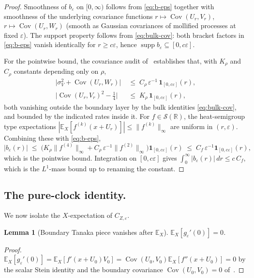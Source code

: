 \documentclass[11pt,reqno]{amsart}
\theoremstyle{plain}
\newtheorem{lemma}[theorem]{Lemma}
\theoremstyle{definition}
\theoremstyle{remark}
\newcommand{\R}{\mathbb{R}}
\newcommand{\E}{\mathbb{E}}
\newcommand{\IBM}{Z}
\DeclareMathOperator{\Cov}{Cov}
\DeclareMathOperator{\supp}{supp}
\begin{document}
\begin{proof}
Smoothness of $b_\varepsilon$ on $[0,\infty)$ follows from
\eqref{eq:b-eps} together with smoothness of the underlying
covariance functions $r\mapsto\Cov(U_r,V_r)$, $r\mapsto\Cov(U_r,W_r)$
(smooth as Gaussian covariances of mollified processes at fixed
$\varepsilon$). The support property follows from
\eqref{eq:bulk-cov}: both bracket factors in \eqref{eq:b-eps} vanish
identically for $r\ge c\varepsilon$, hence
$\supp b_\varepsilon\subseteq[0,c\varepsilon]$.

For the pointwise bound, the covariance audit
of~\cite[Sec.\ 3]{Fontes-FCDC} establishes that, with $K_\rho$ and
$C_\rho$ constants depending only on $\rho$,
\begin{align*}
 \bigl|\sigma_V^2+\Cov(U_r,W_r)\bigr|
 &\;\le\;C_\rho\,\varepsilon^{-1}\,\mathbf 1_{[0,c\varepsilon]}(r),\\
 \bigl|\Cov(U_r,V_r)^2-\tfrac14\bigr|
 &\;\le\;K_\rho\,\mathbf 1_{[0,c\varepsilon]}(r),
\end{align*}
both vanishing outside the boundary layer by the bulk identities
\eqref{eq:bulk-cov}, and bounded by the indicated rates inside it.
For $f\in\mathscr S(\R)$, the heat-semigroup type expectations
$|\E_X[f^{(k)}(x+U_r)]|\le\|f^{(k)}\|_\infty$ are uniform in
$(r,\varepsilon)$. Combining these with \eqref{eq:b-eps},
\[
 |b_\varepsilon(r)|\;\le\;\bigl(K_\rho\|f^{(4)}\|_\infty
   +C_\rho\,\varepsilon^{-1}\|f^{(2)}\|_\infty\bigr)\mathbf 1_{[0,c\varepsilon]}(r)
 \;\le\;C_f\,\varepsilon^{-1}\mathbf 1_{[0,c\varepsilon]}(r),
\]
which is the pointwise bound. Integration on $[0,c\varepsilon]$
gives $\int_0^\infty|b_\varepsilon(r)|\,dr\le c\,C_f$, which is the
$L^{1}$-mass bound up to renaming the constant.
\end{proof}

\subsection*{The pure-clock identity.}
We now isolate the $X$-expectation of $C_{\IBM,\varepsilon}$.

\begin{lemma}[Boundary Tanaka piece vanishes after \texorpdfstring{$\E_X$}{E\_X}]
\label{lem:bdy-zero}
$\E_X[g_\varepsilon'(0)]=0$.
\end{lemma}

\begin{proof}
$\E_X[g_\varepsilon'(0)]=\E_X[f'(x+U_0)V_0]=\Cov(U_0,V_0)\E_X[f''(x+U_0)]=0$
by the scalar Stein identity and the boundary covariance
$\Cov(U_0,V_0)=0$ of~\cite[Lem.\ 3.2]{Fontes-FCDC}.
\end{proof}
\end{document}
